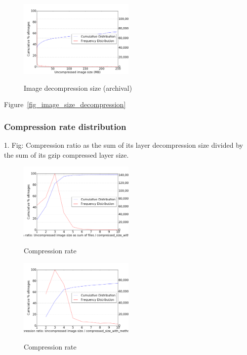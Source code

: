 \begin{figure}
	\centering
	\includegraphics[width=0.5\textwidth]{graphs/Uncompressed_image_size_(MB)}\\
	\caption{Image decompression size (archival)}\label{fig_image_size_compression}
\end{figure}

Figure~\ref{fig_image_size_decompression}

\subsubsection{Compression rate distribution}

1. Fig: Compression ratio as the sum of its layer decompression size divided by the sum of its gzip compressed layer size.

\begin{figure}
	\centering
	\includegraphics[width=0.5\textwidth]{graphs/Compression_ratio_Uncompressed_image_size_as_sum_of_files_divided_by_compressed_size_with_method_gzip}\\
	\caption{Compression rate}\label{fig_image_size_compression}
\end{figure}

\begin{figure}
	\centering
	\includegraphics[width=0.5\textwidth]{graphs/Compression_ratio_Uncompressed_image_size_divided_by_compressed_size_with_method_gzip.png}\\
	\caption{Compression rate}\label{fig_image_size_compression}
\end{figure}

